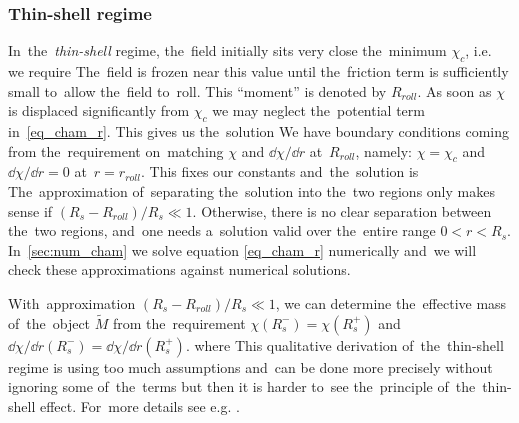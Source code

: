 \subsubsection{Thin-shell regime}
In~the~\textit{thin-shell} regime, the~field initially sits very close the~minimum $\chi_c$, i.e. we require
The~field is frozen near this value until the~friction term is sufficiently small to~allow the~field to~roll. This ``moment'' is denoted by $R_{roll}$. As soon as $\chi$ is displaced significantly from $\chi_c$ we may neglect the~potential term in~\eqref{eq_cham_r}. This gives us the~solution
We have boundary conditions coming from the~requirement on~matching $\chi$ and $\dd\chi/\dd r$ at~$R_{roll}$, namely: $\chi=\chi_c$ and~$\dd\chi/\dd r=0$ at~$r=r_{roll}$. This fixes our constants and~the~solution is
The~approximation of~separating the~solution into the~two regions only makes sense if $(R_s-R_{roll})/R_s\ll1$. Otherwise, there is no clear separation between the~two regions, and~one needs a~solution valid over the~entire range $0<r<R_s$. In~\autoref{sec:num_cham} we solve equation \eqref{eq_cham_r} numerically and~we will check these approximations against numerical solutions.

With~approximation $(R_s-R_{roll})/R_s\ll1$, we can determine the~effective mass of~the~object $\tilde{M}$ from the~requirement $\chi(R_s^-)=\chi(R_s^+)$ and~$\dd\chi/\dd r(R_s^-)=\dd\chi/\dd r(R_s^+)$.
where
This qualitative derivation of~the~thin-shell regime is using too much assumptions and~can be done more precisely without ignoring some of~the~terms but then it is harder to~see the~principle of~the~thin-shell effect. For~more details see e.g. \textcite{Tamaki:2008mf,2007PhRvD..75f3501M,Waterhouse:2006wv}.
